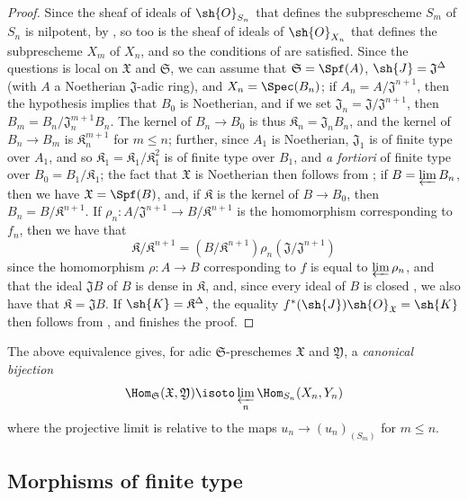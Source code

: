 \begin{proof}
Since the sheaf of ideals of $\sh{O}_{S_n}$ that defines the subprescheme $S_m$ of $S_n$ is nilpotent, by , so too is the sheaf of ideals of $\sh{O}_{X_n}$ that defines the subprescheme $X_m$ of $X_n$, and so the conditions of  are satisfied.
Since the questions is local on $\mathfrak{X}$ and $\mathfrak{S}$, we can assume that $\mathfrak{S}=\Spf(A)$, $\sh{J}=\mathfrak{J}^\Delta$ (with $A$ a Noetherian $\mathfrak{J}$-adic ring), and $X_n=\Spec(B_n)$;
if $A_n=A/\mathfrak{J}^{n+1}$, then the hypothesis implies that $B_0$ is Noetherian, and if we set $\mathfrak{J}_n=\mathfrak{J}/\mathfrak{J}^{n+1}$, then $B_m=B_n/\mathfrak{J}_n^{m+1}B_n$.
The kernel of $B_n\to B_0$ is thus $\mathfrak{K}_n=\mathfrak{J}_nB_n$, and the kernel of $B_n\to B_m$ is $\mathfrak{K}_n^{m+1}$ for $m\leq n$;
further, since $A_1$ is Noetherian, $\mathfrak{J}_1$ is of finite type over $A_1$, and so $\mathfrak{K}_1=\mathfrak{K}_1/\mathfrak{K}_1^2$ is of finite type over $B_1$, and \emph{a fortiori} of finite type over $B_0=B_1/\mathfrak{K}_1$;
the fact that $\mathfrak{X}$ is Noetherian then follows from ;
if $B=\varprojlim B_n$, then we have $\mathfrak{X}=\Spf(B)$, and, if $\mathfrak{K}$ is the kernel of $B\to B_0$, then $B_n=B/\mathfrak{K}^{n+1}$.
If $\rho_n:A/\mathfrak{J}^{n+1}\to B/\mathfrak{K}^{n+1}$ is the homomorphism corresponding to $f_n$, then we have that
\[
    \mathfrak{K}/\mathfrak{K}^{n+1} = (B/\mathfrak{K}^{n+1})\rho_n(\mathfrak{J}/\mathfrak{J}^{n+1})
\]
since the homomorphism $\rho:A\to B$ corresponding to $f$ is equal to $\varprojlim\rho_n$, and that the ideal $\mathfrak{J}B$ of $B$ is dense in $\mathfrak{K}$, and, since every ideal of $B$ is closed , we also have that $\mathfrak{K}=\mathfrak{J}B$.
If $\sh{K}=\mathfrak{K}^\Delta$, the equality $f^*(\sh{J})\sh{O}_\mathfrak{X}=\sh{K}$ then follows from , and finishes the proof.
\end{proof}

\begin{env}[10.12.3.2]
\label{I.10.12.3.2}
The above equivalence gives, for adic $\mathfrak{S}$-preschemes $\mathfrak{X}$ and $\mathfrak{Y}$, a \emph{canonical bijection}
\[
  \Hom_\mathfrak{S}(\mathfrak{X},\mathfrak{Y})\isoto\varprojlim_n\Hom_{S_n}(X_n,Y_n)
\]
where the projective limit is relative to the maps $u_n\to(u_n)_{(S_m)}$ for $m\leq n$.
\end{env}

\subsection{Morphisms of finite type}
\label{subsection:I.10.13}

